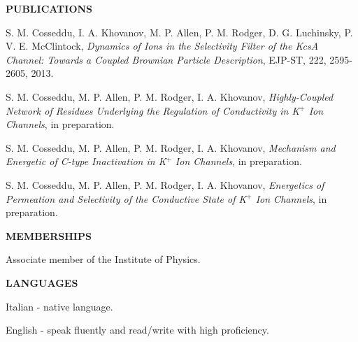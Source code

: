 \documentclass[a4paper,10pt,final]{memoir}
\newcommand{\Sep}{\vspace{1.em}}
\newcommand{\SmallSep}{\vspace{0.3em}}
\newcommand{\CVSection}[1]
	{\Large\textbf{#1}\par
	\SmallSep\normalsize\normalfont}
\begin{document}
\Sep
\CVSection{PUBLICATIONS} 
\begin{compactitem}[\color{RoyalBlue}$\circ$]
\item S. M. Cosseddu, I. A. Khovanov, M. P. Allen, P. M. Rodger, D. G. Luchinsky,
  P. V. E. McClintock, \textit{Dynamics of Ions in the Selectivity Filter of the KcsA
    Channel: Towards a Coupled Brownian Particle Description}, EJP-ST, 222, 2595-2605,
  2013.
\item S. M. Cosseddu, M. P. Allen, P. M. Rodger, I. A. Khovanov, \textit{Highly-Coupled Network of
    Residues Underlying the Regulation of Conductivity in K$^+$ Ion Channels}, in preparation.
\item S. M. Cosseddu, M. P. Allen, P. M. Rodger, I. A. Khovanov, \textit{Mechanism and Energetic
  of C-type Inactivation in K$^+$ Ion Channels}, in preparation.
\item S. M. Cosseddu, M. P. Allen, P. M. Rodger, I. A. Khovanov, \textit{Energetics of
    Permeation and Selectivity of the Conductive State of K$^+$ Ion Channels}, in
  preparation.
\end{compactitem}

\Sep
\CVSection{MEMBERSHIPS} 
Associate member of the Institute of Physics. 

\Sep
\CVSection{LANGUAGES} 
\begin{compactitem}[\color{RoyalBlue}$\circ$]
\item Italian - native language.
\item English - speak fluently and read/write with high proficiency.
\end{compactitem}
\end{document}
